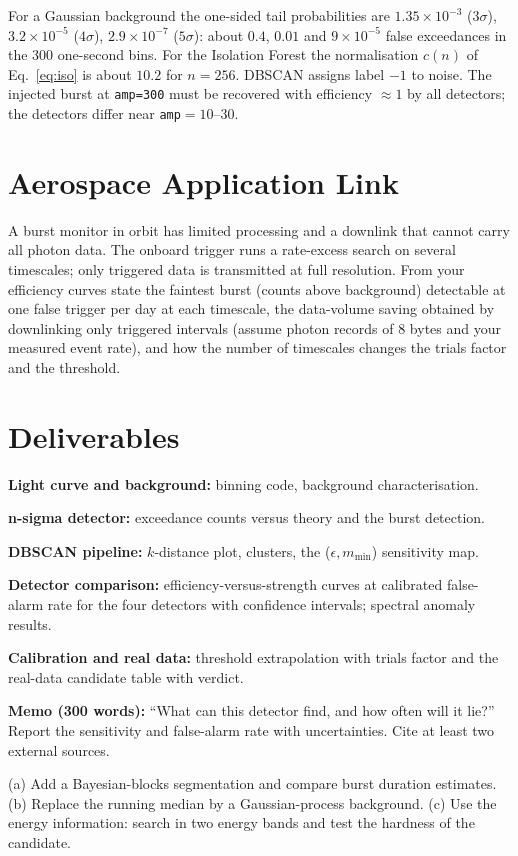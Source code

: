 \documentclass[11pt,a4paper]{article}
\begin{document}
\begin{checkpoint}
For a Gaussian background the one-sided tail probabilities are $1.35\times10^{-3}$ ($3\sigma$), $3.2\times10^{-5}$ ($4\sigma$), $2.9\times10^{-7}$ ($5\sigma$): about $0.4$, $0.01$ and $9\times10^{-5}$ false exceedances in the 300 one-second bins. For the Isolation Forest the normalisation $c(n)$ of Eq.~\eqref{eq:iso} is about $10.2$ for $n=256$. DBSCAN assigns label $-1$ to noise. The injected burst at \texttt{amp=300} must be recovered with efficiency $\approx1$ by all detectors; the detectors differ near \texttt{amp}$=10$--$30$.
\end{checkpoint}

\section*{Aerospace Application Link}
A burst monitor in orbit has limited processing and a downlink that cannot carry all photon data. The onboard trigger runs a rate-excess search on several timescales; only triggered data is transmitted at full resolution. From your efficiency curves state the faintest burst (counts above background) detectable at one false trigger per day at each timescale, the data-volume saving obtained by downlinking only triggered intervals (assume photon records of 8 bytes and your measured event rate), and how the number of timescales changes the trials factor and the threshold.

\section*{Deliverables}
\begin{delivs}
  \item[D1] \textbf{Light curve and background:} binning code, background characterisation.
  \item[D2] \textbf{n-sigma detector:} exceedance counts versus theory and the burst detection.
  \item[D3] \textbf{DBSCAN pipeline:} $k$-distance plot, clusters, the ($\epsilon,m_{\min}$) sensitivity map.
  \item[D4] \textbf{Detector comparison:} efficiency-versus-strength curves at calibrated false-alarm rate for the four detectors with confidence intervals; spectral anomaly results.
  \item[D5] \textbf{Calibration and real data:} threshold extrapolation with trials factor and the real-data candidate table with verdict.
  \item[D6] \textbf{Memo (300 words):} ``What can this detector find, and how often will it lie?'' Report the sensitivity and false-alarm rate with uncertainties. Cite at least two external sources.
  \item[Bonus] (a) Add a Bayesian-blocks segmentation and compare burst duration estimates. (b) Replace the running median by a Gaussian-process background. (c) Use the energy information: search in two energy bands and test the hardness of the candidate.
\end{delivs}
\end{document}
